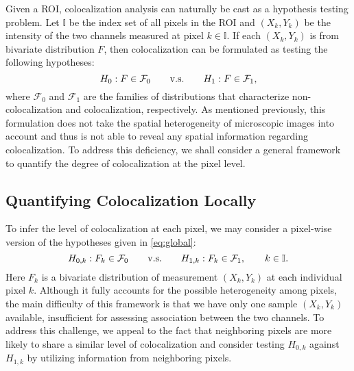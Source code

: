 \documentclass[10pt,twocolumn,twoside]{IEEEtran}
\def\II{{\mathbb I}}
\def\Fcal{\mathcal F}
\begin{document}
Given a ROI, colocalization analysis can naturally be cast as a hypothesis testing problem. Let $\II$ be the index set of all pixels in the ROI and $(X_k, Y_k)$ be the intensity of the two channels measured at pixel $k\in\II$. If each $(X_k,Y_k)$ is from bivariate distribution $F$, then colocalization can be formulated as testing the following hypotheses:
\begin{equation}
\label{eq:global}
H_{0}: F\in \Fcal_0\qquad {\rm v.s.}\qquad H_{1}: F\in \Fcal_1,
\end{equation}
where $\Fcal_0$ and $\Fcal_1$ are the families of distributions that characterize non-colocalization and colocalization, respectively. As mentioned previously, this formulation does not take the spatial heterogeneity of microscopic images into account and thus is not able to reveal any spatial information regarding colocalization. To address this deficiency, we shall consider a general framework to quantify the degree of colocalization at the pixel level.

\subsection{Quantifying Colocalization Locally}
\label{sc:localquan}

To infer the level of colocalization at each pixel, we may consider a pixel-wise version of the hypotheses given in \eqref{eq:global}:
\begin{equation}
\label{eq:multipletest}
H_{0,k}: F_k\in \Fcal_0\qquad {\rm v.s.}\qquad H_{1,k}: F_k\in \Fcal_1,\qquad k\in\II.
\end{equation}
Here $F_k$ is a bivariate distribution of measurement $(X_k,Y_k)$ at each individual pixel $k$. Although it fully accounts for the possible heterogeneity among pixels, the main difficulty of this framework is that we have only one sample $(X_k,Y_k)$ available, insufficient for assessing association between the two channels. To address this challenge, we appeal to the fact that neighboring pixels are more likely to share a similar level of colocalization and consider testing $H_{0,k}$ against $H_{1,k}$ by utilizing information from neighboring pixels.
\end{document}
